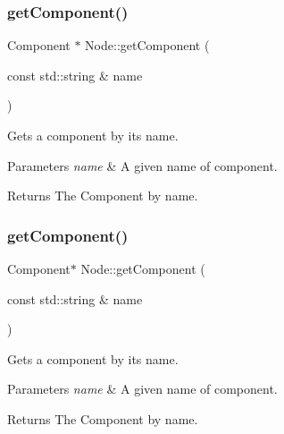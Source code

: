 \mbox{\label{classNode_a149c99ff0cb7285f5e51d331672adbb9}} 
\subsubsection{\texorpdfstring{get\+Component()}{getComponent()}\hspace{0.1cm}{\footnotesize\ttfamily [1/2]}}
{\footnotesize\ttfamily Component $\ast$ Node\+::get\+Component (\begin{DoxyParamCaption}\item[{const std\+::string \&}]{name }\end{DoxyParamCaption})}

Gets a component by its name.


\begin{DoxyParams}{Parameters}
{\em name} & A given name of component. \\
\hline
\end{DoxyParams}
\begin{DoxyReturn}{Returns}
The Component by name. 
\end{DoxyReturn}
\mbox{\label{classNode_a2867ee7521172ead4346cb755e9dbaca}} 
\subsubsection{\texorpdfstring{get\+Component()}{getComponent()}\hspace{0.1cm}{\footnotesize\ttfamily [2/2]}}
{\footnotesize\ttfamily Component$\ast$ Node\+::get\+Component (\begin{DoxyParamCaption}\item[{const std\+::string \&}]{name }\end{DoxyParamCaption})}

Gets a component by its name.


\begin{DoxyParams}{Parameters}
{\em name} & A given name of component. \\
\hline
\end{DoxyParams}
\begin{DoxyReturn}{Returns}
The Component by name. 
\end{DoxyReturn}
\mbox{\label{classNode_a3828836a62dbf0862ecaa99a72babc13}} 
